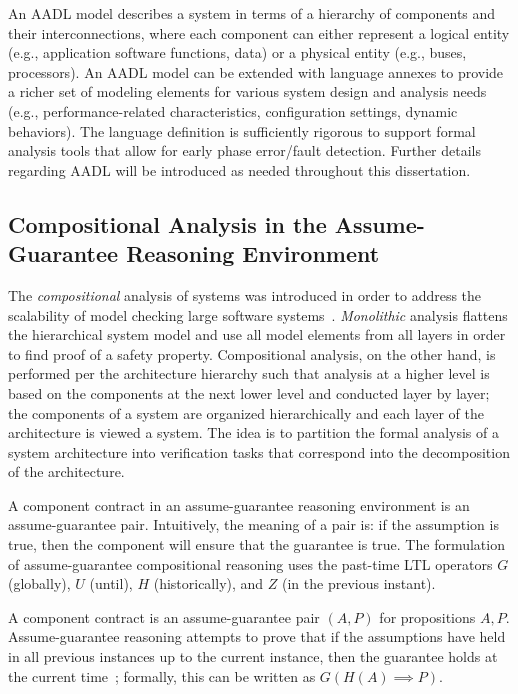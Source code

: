 An AADL model describes a system in terms of a hierarchy of components and their interconnections, where each component can either represent a logical entity (e.g., application software functions, data) or a physical entity (e.g., buses, processors). An AADL model can be extended with language annexes to provide a richer set of modeling elements for various system design and analysis needs (e.g., performance-related characteristics, configuration settings, dynamic behaviors). The language definition is sufficiently rigorous to support formal analysis tools that allow for early phase error/fault detection. Further details regarding AADL will be introduced as needed throughout this dissertation. 

\subsection{Compositional Analysis in the Assume-Guarantee Reasoning Environment}
The {\em compositional} analysis of systems was introduced in order to address the scalability of model checking large software systems~\cite{pnueli1985transition, heckel1998compositional, NFM2012:CoGaMiWhLaLu}. {\em Monolithic} analysis flattens the hierarchical system model and use all model elements from all layers in order to find proof of a safety property. Compositional analysis, on the other hand, is performed per the architecture hierarchy such that analysis at a higher level is based on the components at the next lower level and conducted layer by layer; the components of a system are organized hierarchically and each layer of the architecture is viewed a system. The idea is to partition the formal analysis of a system architecture into verification tasks that correspond into the decomposition of the architecture. 

A component contract in an assume-guarantee reasoning environment is an assume-guarantee pair. Intuitively, the meaning of a pair is: if the assumption is true, then the component will ensure that the guarantee is true. The formulation of assume-guarantee compositional reasoning  uses the past-time LTL operators $G$ (globally), $U$ (until), $H$ (historically), and $Z$ (in the previous instant).

A component contract is an assume-guarantee pair $(A,P)$ for propositions $A, P$. Assume-guarantee reasoning attempts to prove that if the assumptions have held in all previous instances up to the current instance, then the guarantee holds at the current time~\cite{cofer2012compositional}; formally, this can be written as $G(H(A) \implies P)$. 

